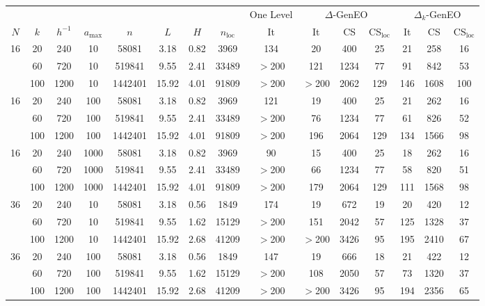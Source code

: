 \documentclass[preprint,3p,times]{elsarticle}
\theoremstyle{definition}
\numberwithin{equation}{section}
\begin{document}
{\begin{table}[H]
    \centering
\hspace*{-2cm}
\begin{tabular}{cccccccc|c|ccc|ccc}
\multicolumn{8}{c|}{} & One Level & \multicolumn{3}{c}{$\Delta$-GenEO} & \multicolumn{3}{c}{$\Delta_k$-GenEO} \\
$N$ & $k$ & $h^{-1}$ & $a_\text{max}$ & $n$ & $L$ & $H$ & $n_\text{loc}$ & It & It & CS & CS$_\text{loc}$ & It & CS & CS$_\text{loc}$  \\
\hline
16 & 20 & 240 & 10 & 58081 & 3.18 & 0.82 & 3969 & 134 & 20 & 400 & 25 & 21 & 258 & 16 \\
 & 60 & 720 & 10 & 519841 &  9.55 & 2.41 & 33489 & $>$200 & 121 & 1234 & 77 & 91 & 842 & 53 \\
 & 100 & 1200 & 10 & 1442401 &  15.92 & 4.01 & 91809 & $>$200 & $>$200 & 2062 & 129 & 146 & 1608 & 100 \\
\hline
16 & 20 & 240 & 100 & 58081 & 3.18 & 0.82 & 3969 & 121 & 19 & 400 & 25 & 21 & 262 & 16 \\
 & 60 & 720 & 100 & 519841 &  9.55 & 2.41 & 33489 & $>$200 & 76 & 1234 & 77 & 61 & 826 & 52 \\
 & 100 & 1200 & 100 & 1442401 &  15.92 & 4.01 & 91809 & $>$200 & 196 & 2064 & 129 & 134 & 1566 & 98 \\
\hline
16 & 20 & 240 & 1000 & 58081 & 3.18 & 0.82 & 3969 & 90 & 15 & 400 & 25 & 18 & 262 & 16 \\
 & 60 & 720 & 1000 & 519841 &  9.55 & 2.41 & 33489 & $>$200 & 66 & 1234 & 77 & 58 & 820 & 51 \\
 & 100 & 1200 & 1000 & 1442401 &  15.92 & 4.01 & 91809 & $>$200 & 179 & 2064 & 129 & 111 & 1568 & 98 \\
\hline
36 & 20 & 240 & 10 & 58081 & 3.18 & 0.56 & 1849 & 174 & 19 & 672 & 19 & 20 & 420 & 12 \\
 & 60 & 720 & 10 & 519841 &  9.55 & 1.62 & 15129 & $>$200 & 151 & 2042 & 57 & 125 & 1328 & 37 \\
 & 100 & 1200 & 10 & 1442401 &  15.92 & 2.68 & 41209 & $>$200 & $>$200 & 3426 & 95 & 195 & 2410 & 67 \\
\hline
36 & 20 & 240 & 100 & 58081 & 3.18 & 0.56 & 1849 & 147 & 19 & 666 & 18 & 21 & 422 & 12 \\
 & 60 & 720 & 100 & 519841 &  9.55 & 1.62 & 15129 & $>$200 & 108 & 2050 & 57 & 73 & 1320 & 37 \\
 & 100 & 1200 & 100 & 1442401 &  15.92 & 2.68 & 41209 & $>$200 & $>$200 & 3426 & 95 & 194 & 2356 & 65 \\

\end{tabular}
\end{table}}
\end{document}
